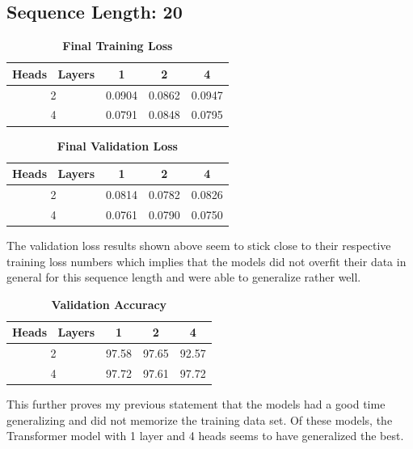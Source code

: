 \documentclass[a4paper]{article}
\begin{document}
\subsection*{\textbf{Sequence Length: 20}}

\begin{table}[H]
    \centering
    \caption{\textbf{Final Training Loss}}
    \label{tab:finalTLseq20p2}
    \begin{tabular}{| c || c | c | c |}
        \hline
        Heads \ Layers & 1 & 2 & 4 \\
        \hline
        2 & 0.0904 & 0.0862 & 0.0947 \\
        \hline
        4 & 0.0791 & 0.0848 & 0.0795 \\
        \hline
    \end{tabular}
\end{table}

\begin{table}[H]
    \centering
    \caption{\textbf{Final Validation Loss}}
    \label{tab:finalVLseq20p2}
    \begin{tabular}{| c || c | c | c |}
        \hline
        Heads \ Layers & 1 & 2 & 4 \\
        \hline
        2 & 0.0814 & 0.0782 & 0.0826 \\
        \hline
        4 & 0.0761 & 0.0790 & 0.0750 \\
        \hline
    \end{tabular}
\end{table}

The validation loss results shown above seem to stick close to their respective training loss numbers which implies that the models did not overfit their data in general for this sequence length and were able to generalize rather well.

\begin{table}[H]
    \centering
    \caption{\textbf{Validation Accuracy}}
    \label{tab:finalVASeq20p2}
    \begin{tabular}{| c || c | c | c |}
        \hline
        Heads \ Layers & 1 & 2 & 4 \\
        \hline
        2 & 97.58 & 97.65 & 92.57 \\
        \hline
        4 & 97.72 & 97.61 & 97.72 \\
        \hline
    \end{tabular}
\end{table}

This further proves my previous statement that the models had a good time generalizing and did not memorize the training data set. Of these models, the Transformer model with 1 layer and 4 heads seems to have generalized the best.
\end{document}
